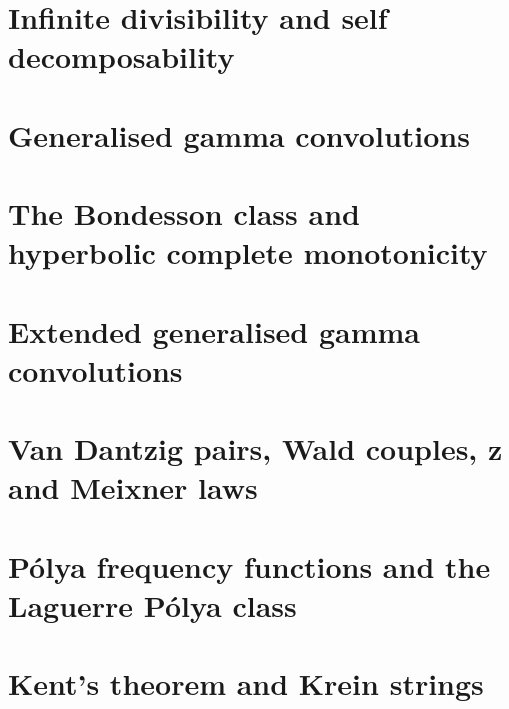 \section{Infinite divisibility and self decomposability}

\section{Generalised gamma convolutions}

\section{The Bondesson class and hyperbolic complete monotonicity}

\section{Extended generalised gamma convolutions}

\section{Van Dantzig pairs, Wald couples, z and Meixner laws}

\section{P\'olya frequency functions and the Laguerre P\'olya class}

\section{Kent's theorem and Krein strings}

